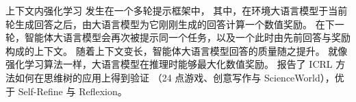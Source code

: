 上下文内强化学习
发生在一个多轮提示框架中，%
其中，在环境大语言模型于当前轮生成回答之后，由大语言模型为它刚刚生成的回答计算一个数值奖励。%
在下一轮，智能体大语言模型会再次被提示同一个任务，以及一个此时由先前回答与奖励构成的上下文。%
随着上下文变长，智能体大语言模型回答的质量随之提升。
就像强化学习算法一样，大语言模型在推理时能够最大化数值奖励。\citet{song2025reward} 报告了 ICRL 方法如何在思维树的应用上得到验证 %
（24 点游戏、创意写作与 ScienceWorld），优于 %
Self-Refine 与 Reflexion。%
%


